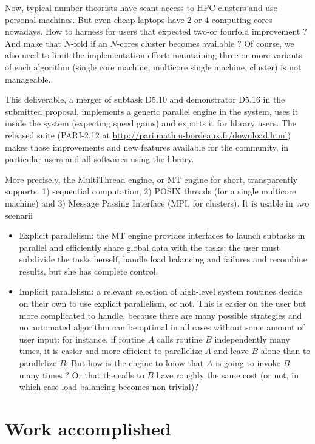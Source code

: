 \documentclass{deliverablereport}
\begin{document}
Now, typical number theorists have scant access to HPC clusters and use
personal machines. But even cheap laptops have 2 or 4 computing cores
nowadays. How to harness for \PariGP users that expected two-or fourfold
improvement ? And make that $N$-fold if an $N$-cores cluster becomes
available ? Of course, we also need to limit the implementation effort:
maintaining three or more variants of each algorithm (single core machine,
multicore single machine, cluster) is not manageable.

This deliverable, a merger of subtask D5.10 and demonstrator D5.16 in the
submitted proposal, implements a generic parallel engine in the
\PariGP system, uses it inside the system (expecting speed gains) and
exports it for library users. The released \PariGP suite (PARI-2.12 at
\url{http://pari.math.u-bordeaux.fr/download.html}) makes those
improvements and new features available for the community, in particular
\Sage users and all softwares using the \Pari library.

More precisely, the MultiThread engine, or MT engine for short, transparently
supports: 1) sequential computation, 2) POSIX threads (for a single multicore
machine) and 3) Message Passing Interface (MPI, for clusters). It is usable
in two scenarii

\begin{itemize}
\item Explicit parallelism: the MT engine provides interfaces to launch
  subtasks in parallel and efficiently share global data with the tasks; the
  user must subdivide the tasks herself, handle load balancing and failures
  and recombine results, but she has complete control.

\item Implicit parallelism: a relevant selection of high-level system
  routines decide on their own to use explicit parallelism, or not. This is
  easier on the user but more complicated to handle, because there are many
  possible strategies and no automated algorithm can be optimal in all
  cases without some amount of user input: for instance, if routine $A$
  calls routine $B$ independently many times, it is easier and more efficient
  to parallelize $A$ and leave $B$ alone than to parallelize $B$. But how is
  the engine to know that $A$ is going to invoke $B$ many times ? Or that the
  calls to $B$ have roughly the same cost (or not, in which case load
  balancing becomes non trivial)?
\end{itemize}

\section{Work accomplished}
\end{document}

